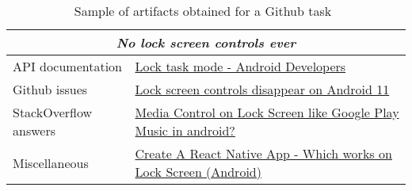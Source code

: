 


\begin{table}[H]
\centering    
\begin{footnotesize}
\begin{threeparttable}
\begin{tabular}{l|l}

\hline

\multicolumn{2}{c}{\textit{No lock screen controls ever}}  \\

\hline
\hline

\multirow{1}{*}{API documentation}
& \href{https://developer.android.com/work/dpc/dedicated-devices/lock-task-mode}{Lock task mode - Android Developers} \\

\multirow{1}{*}{Github issues}
& \href{https://github.com/AntennaPod/AntennaPod/issues/4448}{Lock screen controls disappear on Android 11 } \\


\multirow{1}{*}{StackOverflow answers}
& \href{https://stackoverflow.com/questions/24652078}{Media Control on Lock Screen like Google Play Music in android?} 
\\



\multirow{1}{*}{Miscellaneous}
& \href{https://tinyurl.com/lock-task}{Create A React Native App - Which works on Lock Screen (Android) } \\

\hline


\end{tabular}
\end{threeparttable}
\end{footnotesize}
\caption{Sample of artifacts obtained for a Github task~\cite{git3578} }
\label{tbl:googlesearch-example-git}
\end{table}

